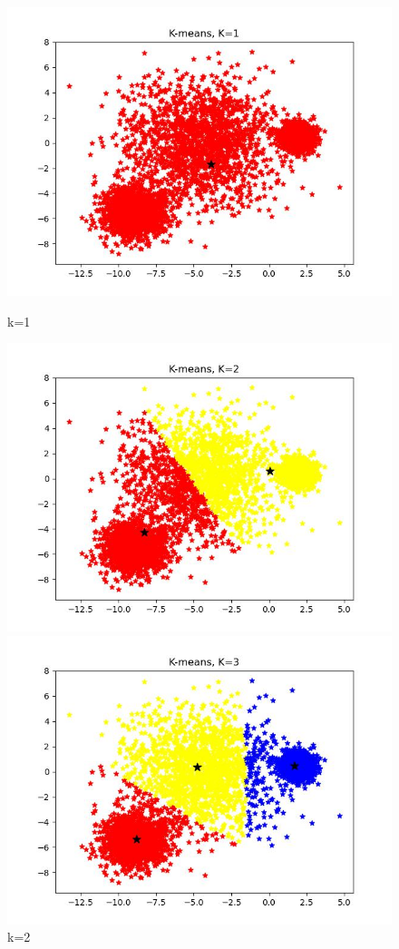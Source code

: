\documentclass[UTF8]{ctexart}
\begin{document}
\begin{figure}[H]
	\centering
	\begin{minipage}{0.32\linewidth}
		\centering
		\includegraphics[width=0.9\linewidth]{k=1.jpg}
		\caption{k=1}
		\label{chutian1}%
	\end{minipage}
	\begin{minipage}{0.32\linewidth}
		\centering
		\includegraphics[width=0.9\linewidth]{k=2.jpg}
		\caption{k=2}
		\label{chutian2}%
	\end{minipage}
  \begin{minipage}{0.32\linewidth}
		\centering
		\includegraphics[width=0.9\linewidth]{k=3.jpg}

\end{minipage}
\end{figure}
\end{document}

